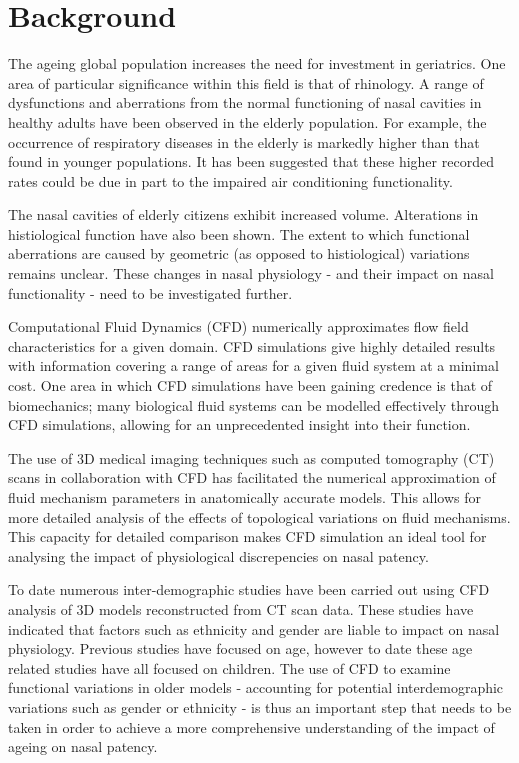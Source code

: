 \section{Background}

The ageing global population increases the need for investment in geriatrics. One area of particular significance within this field is that of rhinology. A range of dysfunctions and aberrations from the normal functioning of nasal cavities in healthy adults have been observed in the elderly population\cite{Edelstein1996, Lindemann2008}. For example, the occurrence of respiratory diseases in the elderly is markedly higher than that found in younger populations\cite{HO2001, Edelstein1996}. It has been suggested that these higher recorded rates could be due in part to the impaired air conditioning functionality\cite{Lindemann2008}.


The nasal cavities of elderly citizens exhibit increased volume\cite{Kalmovich2005}. Alterations in histiological function have also been shown\cite{HO2001}. The extent to which functional aberrations are caused by geometric (as opposed to histiological) variations remains unclear\cite{Varga-Huettner2013}. These changes in nasal physiology - and their impact on nasal functionality - need to be investigated further.


Computational Fluid Dynamics (CFD) numerically approximates flow field characteristics for a given domain. CFD simulations give highly detailed results with information covering a range of areas for a given fluid system at a minimal cost. One area in which CFD simulations have been gaining credence is that of biomechanics; many biological fluid systems can be modelled effectively through CFD simulations, allowing for an unprecedented insight into their function.

The use of 3D medical imaging techniques such as computed tomography (CT) scans in collaboration with CFD has facilitated the numerical approximation of fluid mechanism parameters in anatomically accurate models. This allows for more detailed analysis of the effects of topological variations on fluid mechanisms. This capacity for detailed comparison makes CFD simulation an ideal tool for analysing the impact of physiological discrepencies on nasal patency.


To date numerous inter-demographic studies have been carried out using CFD analysis of 3D models reconstructed from CT scan data\cite{Xi2012, Garcia2007, Zhu2011}. These studies have indicated that factors such as ethnicity and gender are liable to impact on nasal physiology. Previous studies have focused on age\cite{Xi2012}, however to date these age related studies have all focused on children. The use of CFD to examine functional variations in older models - accounting for potential interdemographic variations such as gender or ethnicity - is thus an important step that needs to be taken in order to achieve a more comprehensive understanding of the impact of ageing on nasal patency.


